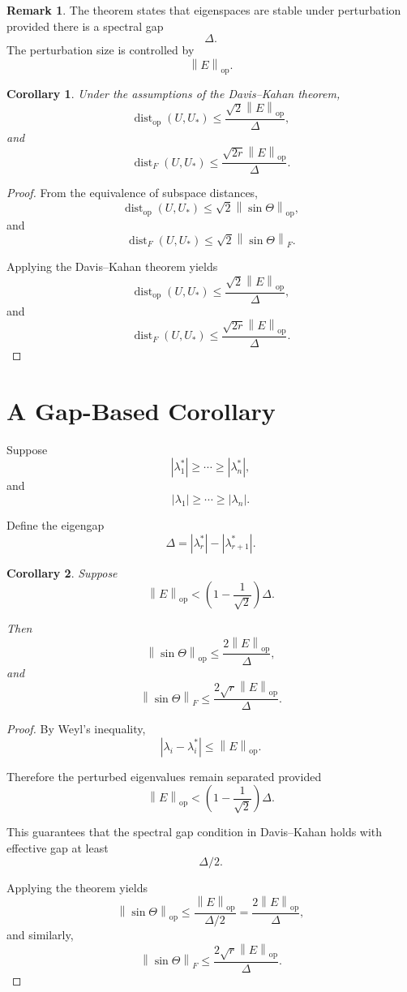 \documentclass[12pt,oneside]{book}
\numberwithin{equation}{section}
\theoremstyle{definition}
\newtheorem{remark}{Remark}[section]
\theoremstyle{plain}
\newtheorem{corollary}{Corollary}[section]
\theoremstyle{remark}
\newcommand{\norm}[1]{\left\lVert #1 \right\rVert}
\begin{document}
\begin{remark}
The theorem states that eigenspaces are stable under perturbation provided there is a spectral gap
\[
\Delta.
\]
The perturbation size is controlled by
\[
\norm{E}_{\mathrm{op}}.
\]
\end{remark}

\begin{corollary}
Under the assumptions of the Davis--Kahan theorem,
\[
\operatorname{dist}_{\mathrm{op}}(U,U_*)
\leq
\frac{\sqrt{2}\norm{E}_{\mathrm{op}}}{\Delta},
\]
and
\[
\operatorname{dist}_F(U,U_*)
\leq
\frac{\sqrt{2r}\norm{E}_{\mathrm{op}}}{\Delta}.
\]
\end{corollary}

\begin{proof}
From the equivalence of subspace distances,
\[
\operatorname{dist}_{\mathrm{op}}(U,U_*)
\leq
\sqrt{2}\norm{\sin\Theta}_{\mathrm{op}},
\]
and
\[
\operatorname{dist}_F(U,U_*)
\leq
\sqrt{2}\norm{\sin\Theta}_F.
\]

Applying the Davis--Kahan theorem yields
\[
\operatorname{dist}_{\mathrm{op}}(U,U_*)
\leq
\frac{\sqrt{2}\norm{E}_{\mathrm{op}}}{\Delta},
\]
and
\[
\operatorname{dist}_F(U,U_*)
\leq
\frac{\sqrt{2r}\norm{E}_{\mathrm{op}}}{\Delta}.
\]
\end{proof}

\section{A Gap-Based Corollary}

Suppose
\[
|\lambda_1^*|
\geq
\cdots
\geq
|\lambda_n^*|,
\]
and
\[
|\lambda_1|
\geq
\cdots
\geq
|\lambda_n|.
\]

Define the eigengap
\[
\Delta
=
|\lambda_r^*|-|\lambda_{r+1}^*|.
\]

\begin{corollary}
Suppose
\[
\norm{E}_{\mathrm{op}}
<
\left(
1-\frac{1}{\sqrt{2}}
\right)\Delta.
\]

Then
\[
\norm{\sin\Theta}_{\mathrm{op}}
\leq
\frac{2\norm{E}_{\mathrm{op}}}{\Delta},
\]
and
\[
\norm{\sin\Theta}_F
\leq
\frac{2\sqrt{r}\norm{E}_{\mathrm{op}}}{\Delta}.
\]
\end{corollary}

\begin{proof}
By Weyl's inequality,
\[
|\lambda_i-\lambda_i^*|
\leq
\norm{E}_{\mathrm{op}}.
\]

Therefore the perturbed eigenvalues remain separated provided
\[
\norm{E}_{\mathrm{op}}
<
\left(
1-\frac{1}{\sqrt{2}}
\right)\Delta.
\]

This guarantees that the spectral gap condition in Davis--Kahan holds with effective gap at least
\[
\Delta/2.
\]

Applying the theorem yields
\[
\norm{\sin\Theta}_{\mathrm{op}}
\leq
\frac{\norm{E}_{\mathrm{op}}}{\Delta/2}
=
\frac{2\norm{E}_{\mathrm{op}}}{\Delta},
\]
and similarly,
\[
\norm{\sin\Theta}_F
\leq
\frac{2\sqrt{r}\norm{E}_{\mathrm{op}}}{\Delta}.
\]
\end{proof}
\end{document}
